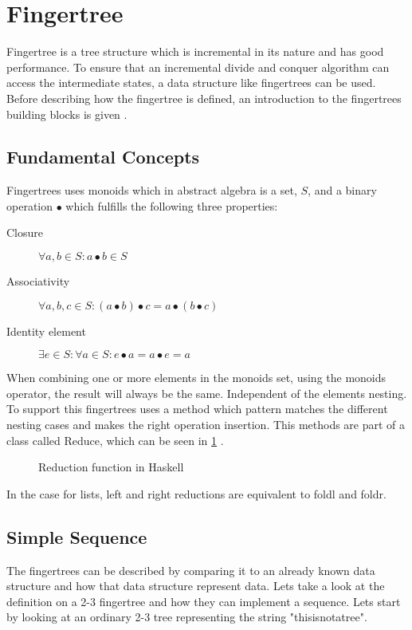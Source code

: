 
\section{Fingertree}
Fingertree is a tree structure which is incremental in its nature and has good
performance. To ensure that an incremental divide and conquer algorithm can
access the intermediate states, a data structure like fingertrees can be used.
Before describing how the fingertree is defined, an introduction to the
fingertrees building blocks is given \cite{fingertree}.

\subsection{Fundamental Concepts}

Fingertrees uses monoids which in abstract algebra is a set, $S$, and a binary
operation $\bullet$ which fulfills the following
three properties:
\begin{description}
\item[Closure] $\forall a,b \in S: a \bullet b \in S$
\item[Associativity] $\forall a,b,c \in S: (a \bullet b) \bullet c = a \bullet
    (b \bullet c)$ 
\item[Identity element] $\exists e \in S: \forall a \in S: e \bullet a = a
    \bullet e = a$
\end{description}

When combining one or more elements in the monoids set, using the monoids operator,
the result will always be the same. Independent of the elements nesting. To support
this fingertrees uses a method which pattern matches the different nesting cases
and makes the right operation insertion. This methods are part of a class called
Reduce, which can be seen in \cref{fig:Reduction} \cite{fingertree}.

\begin{figure}[h!]

\caption{Reduction function in Haskell \label{fig:Reduction}}
\end{figure}

In the case for lists, left and right reductions are equivalent to foldl and foldr.

\subsection{Simple Sequence}
The fingertrees can be described by comparing it to an already
known data structure and how that data structure represent data. Lets take a look
at the definition on a 2-3 fingertree and how they can implement a sequence.
Lets start by looking at an ordinary 2-3 tree representing the string "thisisnotatree".

